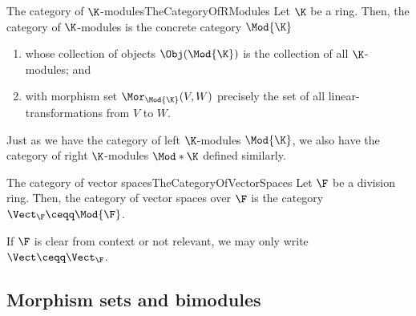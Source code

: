 \begin{exm}{The category of $\K$-modules}{TheCategoryOfRModules}
	Let $\K$ be a ring.  Then, the category of $\K$-modules is the concrete category $\Mod{\K}$\index[notation]{$\Mod{\K}$}
	\begin{enumerate}
		\item whose collection of objects $\Obj (\Mod{\K})$ is the collection of all $\K$-modules; and
		\item with morphism set $\Mor _{\Mod{\K}}(V,W)$ precisely the set of all linear-transformations from $V$ to $W$.
	\end{enumerate}
	\begin{rmk}
		Just as we have the category of left $\K$-modules $\Mod{\K}$, we also have the category of right $\K$-modules $\Mod*{\K}$\index[notation]{$\Mod*{\K}$} defined similarly.
	\end{rmk}
\end{exm}
\begin{exm}{The category of vector spaces}{TheCategoryOfVectorSpaces}
	Let $\F$ be a division ring.  Then, the category of vector spaces over $\F$ is the category $\Vect _{\F}\ceqq \Mod{\F}$\index[notation]{$\Vect _{\F}$}.
	\begin{rmk}
		If $\F$ is clear from context or not relevant, we may only write $\Vect \ceqq \Vect _{\F}$\index[notation]{$\Vect$}.
	\end{rmk}
\end{exm}

\subsection{Morphism sets and bimodules}\label{sss1.1.2}

